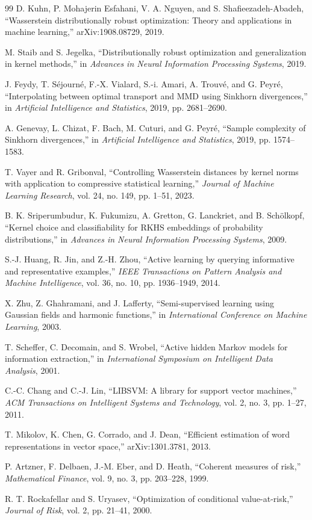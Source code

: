 \documentclass[10pt,journal]{IEEEtran}
\begin{document}
\begin{thebibliography}{99}
D. Kuhn, P. Mohajerin Esfahani, V. A. Nguyen, and S. Shafieezadeh-Abadeh, ``Wasserstein distributionally robust optimization: Theory and applications in machine learning,'' arXiv:1908.08729, 2019.

M. Staib and S. Jegelka, ``Distributionally robust optimization and generalization in kernel methods,'' in \emph{Advances in Neural Information Processing Systems}, 2019.

J. Feydy, T. S{\'e}journ{\'e}, F.-X. Vialard, S.-i. Amari, A. Trouv{\'e}, and G. Peyr{\'e}, ``Interpolating between optimal transport and MMD using Sinkhorn divergences,'' in \emph{Artificial Intelligence and Statistics}, 2019, pp. 2681--2690.

A. Genevay, L. Chizat, F. Bach, M. Cuturi, and G. Peyr{\'e}, ``Sample complexity of Sinkhorn divergences,'' in \emph{Artificial Intelligence and Statistics}, 2019, pp. 1574--1583.

T. Vayer and R. Gribonval, ``Controlling Wasserstein distances by kernel norms with application to compressive statistical learning,'' \emph{Journal of Machine Learning Research}, vol. 24, no. 149, pp. 1--51, 2023.

B. K. Sriperumbudur, K. Fukumizu, A. Gretton, G. Lanckriet, and B. Sch{\"o}lkopf, ``Kernel choice and classifiability for RKHS embeddings of probability distributions,'' in \emph{Advances in Neural Information Processing Systems}, 2009.

S.-J. Huang, R. Jin, and Z.-H. Zhou, ``Active learning by querying informative and representative examples,'' \emph{IEEE Transactions on Pattern Analysis and Machine Intelligence}, vol. 36, no. 10, pp. 1936--1949, 2014.

X. Zhu, Z. Ghahramani, and J. Lafferty, ``Semi-supervised learning using Gaussian fields and harmonic functions,'' in \emph{International Conference on Machine Learning}, 2003.

T. Scheffer, C. Decomain, and S. Wrobel, ``Active hidden Markov models for information extraction,'' in \emph{International Symposium on Intelligent Data Analysis}, 2001.

C.-C. Chang and C.-J. Lin, ``LIBSVM: A library for support vector machines,'' \emph{ACM Transactions on Intelligent Systems and Technology}, vol. 2, no. 3, pp. 1--27, 2011.

T. Mikolov, K. Chen, G. Corrado, and J. Dean, ``Efficient estimation of word representations in vector space,'' arXiv:1301.3781, 2013.


P. Artzner, F. Delbaen, J.-M. Eber, and D. Heath, ``Coherent measures of risk,'' \emph{Mathematical Finance}, vol. 9, no. 3, pp. 203--228, 1999.

R. T. Rockafellar and S. Uryasev, ``Optimization of conditional value-at-risk,'' \emph{Journal of Risk}, vol. 2, pp. 21--41, 2000.

\end{thebibliography}
\end{document}
